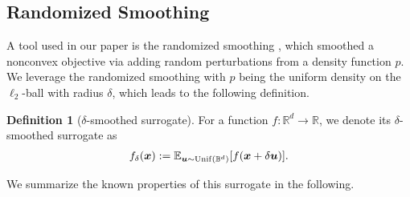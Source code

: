 \documentclass{article}
\def\vzero{{\bm{0}}}
\def\vu{{\bm{u}}}
\def\vx{{\bm{x}}}
\def\mO{{\bm{O}}}
\def\sB{{\mathbb{B}}}
\def\sR{{\mathbb{R}}}
\newcommand{\E}{\mathbb{E}}
\theoremstyle{definition}
\newtheorem{dfn}{Definition}[section]
\theoremstyle{remark}
\begin{document}
	
	
	
	
	
	
	\subsection{Randomized Smoothing}
	
	A tool used in our paper is the randomized smoothing \citep{duchi2012randomized,yousefian2012stochastic}, which smoothed a nonconvex objective via adding random perturbations from a density function $p$. We leverage the randomized smoothing with $p$ being the uniform density on the $\ell_2$-ball with radius $\delta$, which leads to the following definition.
	
	\begin{dfn}[$\delta$-smoothed surrogate]\label{dfn:f-delta}
		For a function $f: \sR^d \rightarrow \sR$, we denote its $\delta$-smoothed surrogate as
		\begin{align*}
			f_{\delta}(\vx) := \E_{\vu\sim {\rm Unif}(\sB^d)}[f(\vx + \delta \vu)].
		\end{align*} 
	\end{dfn}
	
	We summarize the known properties of this surrogate \citep{yousefian2012stochastic,duchi2012randomized,lin2022gradient,kornowski2024algorithm} in the following. 
	
\end{document}
